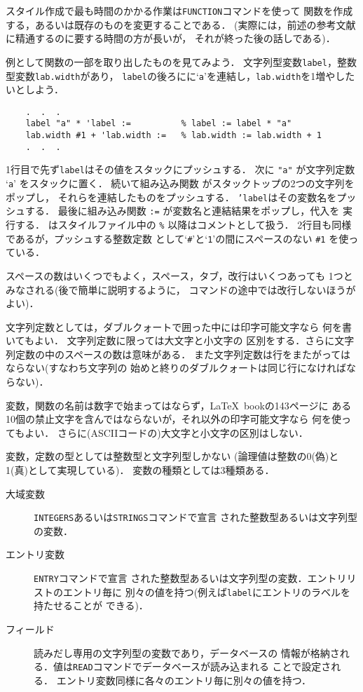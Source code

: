 スタイル作成で最も時間のかかる作業は{\tt FUNCTION}コマンドを使って
関数を作成する，あるいは既存のものを変更することである．
(実際には，前述の参考文献に精通するのに要する時間の方が長いが，
それが終った後の話しである)．

例として関数の一部を取り出したものを見てみよう．
文字列型変数{\tt label}，整数型変数{\tt lab.width}があり，
{\tt label}の後ろにに`{\tt a}'を連結し，{\tt lab.width}を1増やしたいとしよう．
\begin{verbatim}
    .  .  .
    label "a" * 'label :=          % label := label * "a"
    lab.width #1 + 'lab.width :=   % lab.width := lab.width + 1
    .  .  .
\end{verbatim}
1行目で先ず{\tt label}はその値をスタックにプッシュする．
次に {\tt "a"} が文字列定数 `{\tt a}' をスタックに置く．
続いて組み込み関数 {\tt *} がスタックトップの2つの文字列をポップし，
それらを連結したものをプッシュする．
{\tt 'label}はその変数名をプッシュする．
最後に組み込み関数 {\tt :=} が変数名と連結結果をポップし，代入を
実行する．
\BibTeX はスタイルファイル中の {\tt \%} 以降はコメントとして扱う．
2行目も同様であるが，プッシュする整数定数
として`{\tt \#}'と`{\tt 1}'の間にスペースのない {\tt \#1} を使っている．

スペースの数はいくつでもよく，スペース，タブ，改行はいくつあっても
1つとみなされる(後で簡単に説明するように，
コマンドの途中では改行しないほうがよい)．

文字列定数としては，ダブルクォートで囲った中には印字可能文字なら
何を書いてもよい．
文字列定数に限って\BibTeX は大文字と小文字の
区別をする．さらに文字列定数の中のスペースの数は意味が{\dg ある}．
また文字列定数は行をまたがってはならない(すなわち文字列の
始めと終りのダブルクォートは同じ行になければならない)．

変数，関数の名前は数字で始まってはならず，\LaTeX~bookの143ページに
ある10個の禁止文字を含んではならないが，それ以外の印字可能文字なら
何を使ってもよい．
さらに(ASCIIコードの)大文字と小文字の区別はしない．

変数，定数の型としては整数型と文字列型しかない
(論理値は整数の0(偽)と1(真)として実現している)．
変数の種類としては3種類ある．
\begin{description}

\item[大域変数\hfill] {\tt INTEGERS}あるいは{\tt STRINGS}コマンドで宣言
された整数型あるいは文字列型の変数．

\item[エントリ変数\hfill] {\tt ENTRY}コマンドで宣言
された整数型あるいは文字列型の変数．エントリリストのエントリ毎に
別々の値を持つ(例えば{\tt label}にエントリのラベルを持たせることが
できる)．

\item[フィールド\hfill] 読みだし専用の文字列型の変数であり，データベースの
情報が格納される．値は{\tt READ}コマンドでデータベースが読み込まれる
ことで設定される．
エントリ変数同様に各々のエントリ毎に別々の値を持つ．
\end{description}



